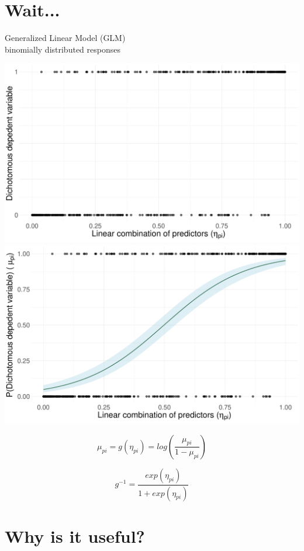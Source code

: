 \documentclass{beamer}
\begin{document}
\section{Wait...}
\begin{frame}

\begin{center}
	Generalized Linear Model (GLM)\\
	\small binomially distributed responses
\end{center}

	\begin{overprint}
					\centering
					\includegraphics[width=.70\linewidth]{baseGLM.pdf}
			\onslide<3>
				\centering
				\includegraphics[width=.70\linewidth]{linkGLM.pdf}
	\end{overprint}


		\begin{equation*}
	\mu_{pi} = g(\eta_{pi}) = log\left(\frac{\mu_{pi}}{1 - \mu_{pi}}\right)
\end{equation*}

\begin{equation*}
	g^{-1} = \frac{exp(\eta_{pi})}{1 + exp(\eta_{pi})}
\end{equation*}
\end{frame}


\section{Why is it useful?}
\end{document}
